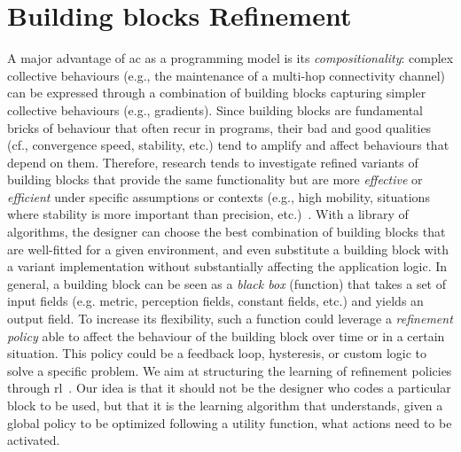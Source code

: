 \section{Building blocks Refinement}\label{coordination2022:s:learning-gradient}
A major advantage of \ac{ac} as a programming model is its \emph{compositionality}: complex collective behaviours (e.g., the maintenance of a multi-hop connectivity channel) can be expressed through a combination of building blocks capturing simpler collective behaviours (e.g., gradients).
%
Since building blocks are fundamental bricks of behaviour that often recur in programs, 
 their bad and good qualities (cf., convergence speed, stability, etc.) tend to amplify and affect behaviours that depend on them.
%
%
Therefore, research tends to investigate refined variants of building blocks that provide the same functionality but are more \emph{effective} or \emph{efficient} under specific assumptions or contexts (e.g., high mobility, situations where stability is more important than precision, etc.)~\cite{DBLP:conf/saso/AudritoCDV17,DBLP:journals/cee/AudritoCDPV21}.
%
With a library of algorithms, 
 the designer can choose the best combination of building blocks that are well-fitted for a given environment, 
 and even substitute a building block with a variant implementation without substantially affecting the application logic.
In general, a building block can be seen as a \emph{black box} (function) that takes a set of input fields (e.g. metric, perception fields, constant fields, etc.) and yields an output field. 
%
To increase its flexibility, 
 such a function could leverage a \emph{refinement policy} able to affect the behaviour of the building block over time or in a certain situation. 
%
This policy could be a feedback loop, hysteresis, or custom logic to solve a specific problem.
%
We aim at structuring the learning of refinement policies through \ac{rl}~\cite{DBLP:conf/acsos/Aguzzi21}.
%
Our idea is that it should not be the designer who codes a particular block to be used, 
 but that it is the learning algorithm that understands, given a global policy to be optimized following a utility function, 
 what actions need to be activated.

